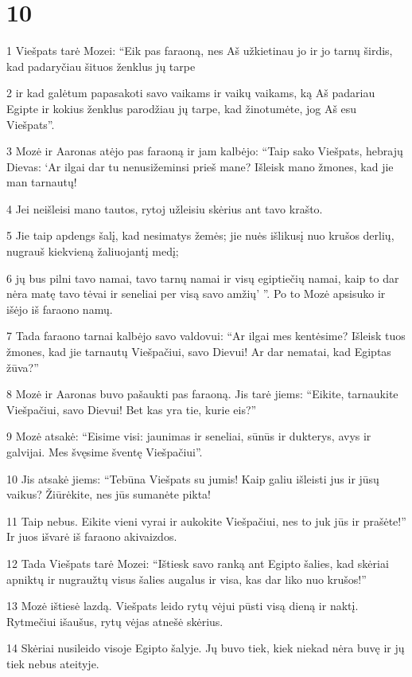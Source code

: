 \chapter{10}

\par 1 Viešpats tarė Mozei: “Eik pas faraoną, nes Aš užkietinau jo ir jo tarnų širdis, kad padaryčiau šituos ženklus jų tarpe 
\par 2 ir kad galėtum papasakoti savo vaikams ir vaikų vaikams, ką Aš padariau Egipte ir kokius ženklus parodžiau jų tarpe, kad žinotumėte, jog Aš esu Viešpats”. 
\par 3 Mozė ir Aaronas atėjo pas faraoną ir jam kalbėjo: “Taip sako Viešpats, hebrajų Dievas: ‘Ar ilgai dar tu nenusižeminsi prieš mane? Išleisk mano žmones, kad jie man tarnautų! 
\par 4 Jei neišleisi mano tautos, rytoj užleisiu skėrius ant tavo krašto. 
\par 5 Jie taip apdengs šalį, kad nesimatys žemės; jie nuės išlikusį nuo krušos derlių, nugrauš kiekvieną žaliuojantį medį; 
\par 6 jų bus pilni tavo namai, tavo tarnų namai ir visų egiptiečių namai, kaip to dar nėra matę tavo tėvai ir seneliai per visą savo amžių’ ”. Po to Mozė apsisuko ir išėjo iš faraono namų. 
\par 7 Tada faraono tarnai kalbėjo savo valdovui: “Ar ilgai mes kentėsime? Išleisk tuos žmones, kad jie tarnautų Viešpačiui, savo Dievui! Ar dar nematai, kad Egiptas žūva?” 
\par 8 Mozė ir Aaronas buvo pašaukti pas faraoną. Jis tarė jiems: “Eikite, tarnaukite Viešpačiui, savo Dievui! Bet kas yra tie, kurie eis?” 
\par 9 Mozė atsakė: “Eisime visi: jaunimas ir seneliai, sūnūs ir dukterys, avys ir galvijai. Mes švęsime šventę Viešpačiui”. 
\par 10 Jis atsakė jiems: “Tebūna Viešpats su jumis! Kaip galiu išleisti jus ir jūsų vaikus? Žiūrėkite, nes jūs sumanėte pikta! 
\par 11 Taip nebus. Eikite vieni vyrai ir aukokite Viešpačiui, nes to juk jūs ir prašėte!” Ir juos išvarė iš faraono akivaizdos. 
\par 12 Tada Viešpats tarė Mozei: “Ištiesk savo ranką ant Egipto šalies, kad skėriai apniktų ir nugraužtų visus šalies augalus ir visa, kas dar liko nuo krušos!” 
\par 13 Mozė ištiesė lazdą. Viešpats leido rytų vėjui pūsti visą dieną ir naktį. Rytmečiui išaušus, rytų vėjas atnešė skėrius. 
\par 14 Skėriai nusileido visoje Egipto šalyje. Jų buvo tiek, kiek niekad nėra buvę ir jų tiek nebus ateityje. 
